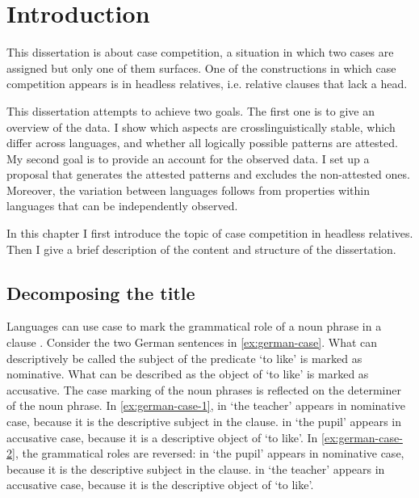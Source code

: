
\chapter{Introduction}\label{ch:introduction}

This dissertation is about case competition, a situation in which two cases are assigned but only one of them surfaces. One of the constructions in which case competition appears is in headless relatives, i.e. relative clauses that lack a head.

This dissertation attempts to achieve two goals. The first one is to give an overview of the data. I show which aspects are crosslinguistically stable, which differ across languages, and whether all logically possible patterns are attested. My second goal is to provide an account for the observed data. I set up a proposal that generates the attested patterns and excludes the non-attested ones. Moreover, the variation between languages follows from properties within languages that can be independently observed.

In this chapter I first introduce the topic of case competition in headless relatives.
Then I give a brief description of the content and structure of the dissertation.


\section{Decomposing the title}

Languages can use case to mark the grammatical role of a noun phrase in a clause \citep[cf.][]{moravcsik2009}. Consider the two German sentences in \ref{ex:german-case}. What can descriptively be called the subject of the predicate  `to like' is marked as nominative. What can be described as the object of  `to like' is marked as accusative. The case marking of the noun phrases is reflected on the determiner of the noun phrase.
In \ref{ex:german-case-1},  in  `the teacher' appears in nominative case, because it is the descriptive subject in the clause.  in  `the pupil' appears in accusative case, because it is a descriptive object of  `to like'.
In \ref{ex:german-case-2}, the grammatical roles are reversed:  in  `the pupil' appears in nominative case, because it is the descriptive subject in the clause.  in  `the teacher' appears in accusative case, because it is the descriptive object of  `to like'.

